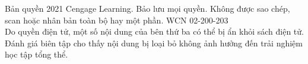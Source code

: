 \documentclass[10pt]{article}
\begin{document}
\vfill

\noindent
\begin{minipage}{\textwidth}
  \fontsize{6}{7.5}\selectfont\color{black!50}
  Bản quyền 2021 Cengage Learning. Bảo lưu mọi quyền. Không được sao chép, scan hoặc nhân bản toàn bộ hay một phần. WCN 02-200-203\\
  Do quyền điện tử, một số nội dung của bên thứ ba có thể bị ẩn khỏi sách điện tử. Đánh giá biên tập cho thấy nội dung bị loại bỏ không ảnh hưởng đến trải nghiệm học tập tổng thể.
\end{minipage}
\end{document}

